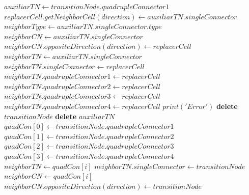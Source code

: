 \begin{algorithm}[!ht]
{\begin{algorithmic}[1]
        \State
            \State $auxiliarTN \gets transitionNode.quadrupleConnector1$
            \State $replacerCell.getNeighborCell(direction) \gets auxiliarTN.singleConnector$
            \State $neighborType \gets auxiliarTN.singleConnector.type$
                \State $neighborCN \gets auxiliarTN.singleConnector$
                \State $neighborCN.oppositeDirection(direction) \gets replacerCell$
            \Else
                \State $neighborTN \gets auxiliarTN.singleConnector$
                    \State $neighborTN.singleConnector \gets replacerCell$
                    \State $neighborTN.quadrupleConnector1 \gets replacerCell$
                    \State $neighborTN.quadrupleConnector2 \gets replacerCell$
                    \State $neighborTN.quadrupleConnector3 \gets replacerCell$
                    \State $neighborTN.quadrupleConnector4 \gets replacerCell$
                \Else
                    \State $print('Error')$
                \EndIf
            \EndIf
            \State \textbf{delete} $transitionNode$
            \State \textbf{delete} $auxiliarTN$
        \Else {}
            \State $quadCon[0] \gets transitionNode.quadrupleConnector1$
            \State $quadCon[1] \gets transitionNode.quadrupleConnector2$
            \State $quadCon[2] \gets transitionNode.quadrupleConnector3$
            \State $quadCon[3] \gets transitionNode.quadrupleConnector4$
                    \State $neighborTN \gets quadCon[i]$
                    \State $neighborTN.singleConnector \gets transitionNode$
                \Else {}
                    \State $neighborCN \gets quadCon[i]$
                    \State $neighborCN.oppositeDirection(direction) \gets transitionNode$
                \EndIf
            \EndFor
        \EndIf
    \EndProcedure
    \end{algorithmic}
    }
    \label{SIMPLIFICATION_DEREFINEMENT}
\end{algorithm}
